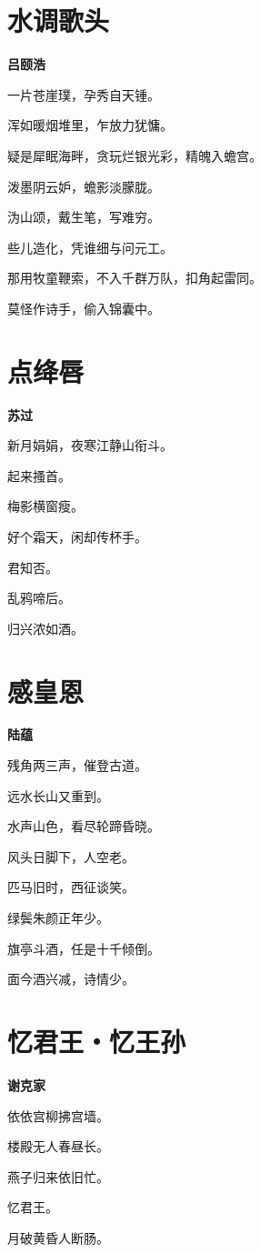 \documentclass[12pt,a4paper]{ctexbook}
\begin{document}
\section{水调歌头}
\textbf{吕颐浩}\par\vspace{0.5em}
一片苍崖璞，孕秀自天锺。\par
浑如暖烟堆里，乍放力犹慵。\par
疑是犀眠海畔，贪玩烂银光彩，精魄入蟾宫。\par
泼墨阴云妒，蟾影淡朦胧。\par
沩山颂，戴生笔，写难穷。\par
些儿造化，凭谁细与问元工。\par
那用牧童鞭索，不入千群万队，扣角起雷同。\par
莫怪作诗手，偷入锦囊中。\par

\section{点绛唇}
\textbf{苏过}\par\vspace{0.5em}
新月娟娟，夜寒江静山衔斗。\par
起来搔首。\par
梅影横窗瘦。\par
好个霜天，闲却传杯手。\par
君知否。\par
乱鸦啼后。\par
归兴浓如酒。\par

\section{感皇恩}
\textbf{陆蕴}\par\vspace{0.5em}
残角两三声，催登古道。\par
远水长山又重到。\par
水声山色，看尽轮蹄昏晓。\par
风头日脚下，人空老。\par
匹马旧时，西征谈笑。\par
绿鬓朱颜正年少。\par
旗亭斗酒，任是十千倾倒。\par
面今酒兴减，诗情少。\par

\section{忆君王・忆王孙}
\textbf{谢克家}\par\vspace{0.5em}
依依宫柳拂宫墙。\par
楼殿无人春昼长。\par
燕子归来依旧忙。\par
忆君王。\par
月破黄昏人断肠。\par
\end{document}
